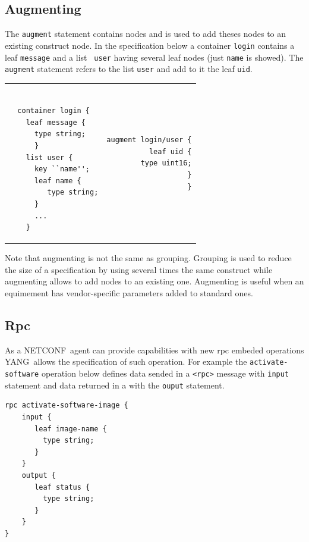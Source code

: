 \documentclass[a4paper]{article}
\newcommand{\nc}{NETCONF}
\newcommand{\y}{YANG}
\begin{document}
\subsection{Augmenting}

The {\tt augment}  statement contains nodes and is  used to add theses
nodes  to an  existing construct  node. In  the specification  below a
container {\tt  login} contains a leaf  {\tt message} and  a list {\tt
user} having several leaf nodes  (just {\tt name} is showed). The {\tt
augment} statement  refers to the  list {\tt user}  and add to  it the
leaf {\tt uid}.

\noindent
\begin{tabular}{lr}
\begin{minipage}{.5\textwidth}
\begin{verbatim}

  container login {
    leaf message {
      type string;
      }
    list user {
      key ``name'';
      leaf name { 
         type string;
      }
      ...
    }
\end{verbatim}
\end{minipage}
&
\begin{minipage}{.5\textwidth}
\begin{verbatim}
augment login/user {
  leaf uid {
    type uint16;
  }
}
\end{verbatim}
\end{minipage}
\end{tabular}

Note that augmenting is not the  same as grouping. Grouping is used to
reduce the  size of  a specification by  using several times  the same
construct  while  augmenting  allows  to  add  nodes  to  an  existing
one.  Augmenting  is useful  when  an  equimement has  vendor-specific
parameters added to standard ones.

\subsection{Rpc}

As  a  \nc\  agent  can  provide capabilities  with  new  rpc  embeded
operations \y\ allows the specification of such operation. For example
the {\tt  activate-software} operation below defines data  sended in a
{\tt <rpc>} message with {\tt  input} statement and data returned in a
{\tt <rpc-reply>} with the {\tt ouput} statement.

\begin{verbatim}
rpc activate-software-image {
    input {
       leaf image-name {
         type string;
       }
    }
    output {
       leaf status {
         type string;
       }
    }
}
\end{verbatim}
\end{document}
